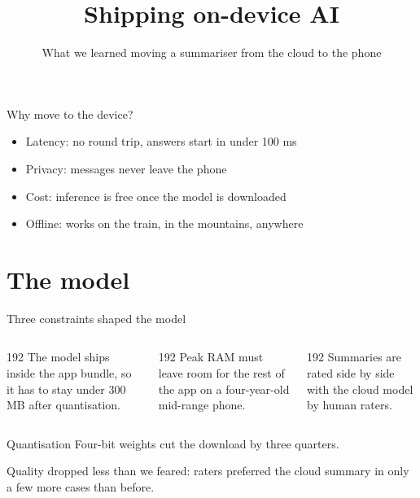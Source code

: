 \documentclass[aspectratio=169]{beamer}
\title{Shipping \textbf{on-device} AI}
\subtitle{What we learned moving a summariser from the cloud to the phone}
\begin{document}
\begin{frame}[plain]
  \titlepage
\end{frame}

\begin{frame}{Why move to the device?}
  \begin{itemize}
    \item Latency: no round trip, answers start in under 100 ms
    \item Privacy: messages never leave the phone
    \item Cost: inference is free once the model is downloaded
    \item Offline: works on the train, in the mountains, anywhere
  \end{itemize}
\end{frame}

\section{The model}

\begin{frame}{Three constraints shaped the model}
  \begin{columns}[T]
    \begin{column}{192\gpt}
      The model ships inside the app bundle, so it has to stay under 300 MB after
      quantisation.
    \end{column}
    \begin{column}{192\gpt}
      Peak RAM must leave room for the rest of the app on a four-year-old mid-range phone.
    \end{column}
    \begin{column}{192\gpt}
      Summaries are rated side by side with the cloud model by human raters.
    \end{column}
  \end{columns}
\end{frame}

\begin{frame}[split]{Quantisation}
  Four-bit weights cut the download by three quarters.

  Quality dropped less than we feared: raters preferred the cloud summary in only a few
  more cases than before.
\end{frame}

\begin{frame}
  \numbers
    {}
    {}
    {}
    {}
    {}
    {}
\end{frame}
\end{document}
